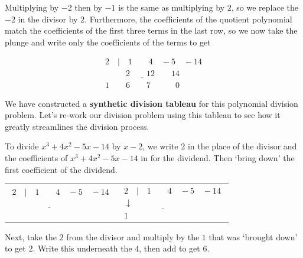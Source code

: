\documentclass{ximera}
\begin{document}
 

 Multiplying by $-2$ then by $-1$ is the same as multiplying by $2$, so we replace the $-2$ in the divisor by $2$.   Furthermore, the coefficients of the quotient polynomial match the coefficients of the first three terms in the last row, so we now take the plunge and write only the coefficients of the terms to get

\[
\begin{array}{r}
 2 \quad |\quad 1 \quad\quad 4 \quad -5 \quad -14 \\
 \underline{\phantom{1} \quad\quad 2 \quad\quad 12 \quad\quad 14 }\\
 1 \quad\quad 6 \quad\quad 7 \quad\quad\quad 0
\end{array}
\]

We have constructed a \textbf{synthetic division tableau} for this polynomial division problem.  Let's re-work our division problem using this tableau to see how it greatly streamlines the division process.  

 

To divide $x^3+4x^2-5x-14$ by $x-2$, we write $2$ in the place of the divisor and the coefficients of $x^3+4x^2-5x-14$ in for the dividend.  Then `bring down' the first coefficient of the dividend.

\begin{center}
\begin{tabular}{cc}
$
\begin{array}{r}
 2 \quad |\quad 1 \quad\quad 4 \quad -5 \quad -14 \\
 \underline{\phantom{1 \quad\quad 2 \quad\quad 12 \quad\quad 14 }}\\
 \phantom{1 \quad\quad 6 \quad\quad 7 \quad\quad\quad 0}
\end{array}
$

\quad\quad\quad 
&
\quad\quad\quad

$
\begin{array}{r}
 2 \quad |\quad 1 \quad\quad 4 \quad -5 \quad -14 \\
 \underline{\downarrow \quad\quad \phantom{ \quad\quad 11 \quad\quad 1.1 }}\\
 1 \quad\quad \phantom{6 \quad\quad 7 \quad\quad\quad 0}
\end{array}
$

\end{tabular}
\end{center}

Next, take the $2$ from the divisor and multiply by the $1$ that was `brought down' to get $2$.  Write this underneath the $4$, then add to get $6$.
\end{document}
